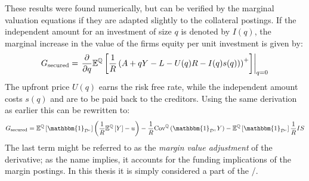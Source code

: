 \documentclass[../main.tex]{subfiles}
\begin{document}
        These results were found numerically, 
        but can be verified by the marginal valuation equations
        if they are adapted slightly to the collateral postings.
        If the independent amount for an investment of size $q$ is denoted by $I(q)$,
        the marginal increase in the value of the firms equity per unit investment is given by:
            \begin{equation*}
                G_{\text{secured}} = 
                    \left.
                    \frac{
                        \partial 
                    }{
                        \partial 
                        q
                    }
                    \mathbb{E}^{\mathbb{Q}}\left[
                        \frac{1}{R} 
                        \left(
                            A + qY - L - U(q)R - I(q) s(q))
                        \right)^{+}
                    \right] 
                    \right\rvert_{q=0} 
                    \nonumber
            \end{equation*}
        The upfront price $U(q)$ earns the risk free rate,
        while the independent amount costs $s(q)$ and are to be paid back to the creditors.
        Using the same derivation as earlier this can be rewritten to:
            \begin{equation}
                G_{\text{secured}} 
                =
                    \mathbb{E}^{\mathbb{Q}}\left[\mathbbm{1}_{\mathcal{D}^{c}}\right] 
                    \left(
                        \discountfactor
                        \mathbb{E}^{\mathbb{Q}}\left[Y\right] 
                        - u
                    \right)
                    -
                    \discountfactor
                    \text{Cov}^{\mathbb{Q}}\left(\mathbbm{1}_{\mathcal{D}}, Y\right) 
                    - 
                    \mathbb{E}^{\mathbb{Q}}\left[
                        \mathbbm{1}_{\mathcal{D}^{c}}
                    \right] \discountfactor I S
                \label{eqn:marginal-shareholder-value-debt-financing-collateral}
            \end{equation}
        The last term might be referred to as the \textit{margin value adjustment} of the derivative;
        as the name implies, it accounts for the funding implications of the margin postings.
        In this thesis it is simply considered a part of the \FVA/.
\end{document}
